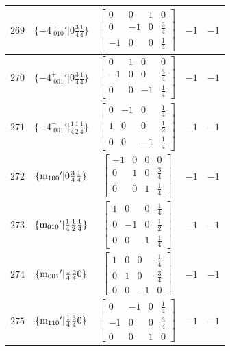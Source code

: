 \documentclass[fleqn,8pt]{jsarticle}
\begin{document}
\begin{longtable}{ccccc}
$ 269 $ & $ \{-4^{-}_{\,\,010}{}'|0 \frac{3}{4} \frac{1}{4}\} $ & $ \begin{bmatrix} 0 & 0 & 1 & 0 \\ 0 & -1 & 0 & \frac{3}{4} \\ -1 & 0 & 0 & \frac{1}{4} \end{bmatrix} $ & $ -1 $ & $ -1 $ \\ \hline
$ 270 $ & $ \{-4^{+}_{\,\,001}{}'|0 \frac{3}{4} \frac{1}{4}\} $ & $ \begin{bmatrix} 0 & 1 & 0 & 0 \\ -1 & 0 & 0 & \frac{3}{4} \\ 0 & 0 & -1 & \frac{1}{4} \end{bmatrix} $ & $ -1 $ & $ -1 $ \\ \hline
$ 271 $ & $ \{-4^{-}_{\,\,001}{}'|\frac{1}{4} \frac{1}{2} \frac{1}{4}\} $ & $ \begin{bmatrix} 0 & -1 & 0 & \frac{1}{4} \\ 1 & 0 & 0 & \frac{1}{2} \\ 0 & 0 & -1 & \frac{1}{4} \end{bmatrix} $ & $ -1 $ & $ -1 $ \\ \hline
$ 272 $ & $ \{{\rm m}_{100}{}'|0 \frac{3}{4} \frac{1}{4}\} $ & $ \begin{bmatrix} -1 & 0 & 0 & 0 \\ 0 & 1 & 0 & \frac{3}{4} \\ 0 & 0 & 1 & \frac{1}{4} \end{bmatrix} $ & $ -1 $ & $ -1 $ \\ \hline
$ 273 $ & $ \{{\rm m}_{010}{}'|\frac{1}{4} \frac{1}{2} \frac{1}{4}\} $ & $ \begin{bmatrix} 1 & 0 & 0 & \frac{1}{4} \\ 0 & -1 & 0 & \frac{1}{2} \\ 0 & 0 & 1 & \frac{1}{4} \end{bmatrix} $ & $ -1 $ & $ -1 $ \\ \hline
$ 274 $ & $ \{{\rm m}_{001}{}'|\frac{1}{4} \frac{3}{4} 0\} $ & $ \begin{bmatrix} 1 & 0 & 0 & \frac{1}{4} \\ 0 & 1 & 0 & \frac{3}{4} \\ 0 & 0 & -1 & 0 \end{bmatrix} $ & $ -1 $ & $ -1 $ \\ \hline
$ 275 $ & $ \{{\rm m}_{110}{}'|\frac{1}{4} \frac{3}{4} 0\} $ & $ \begin{bmatrix} 0 & -1 & 0 & \frac{1}{4} \\ -1 & 0 & 0 & \frac{3}{4} \\ 0 & 0 & 1 & 0 \end{bmatrix} $ & $ -1 $ & $ -1 $ \\ \hline

\end{longtable}
\end{document}
